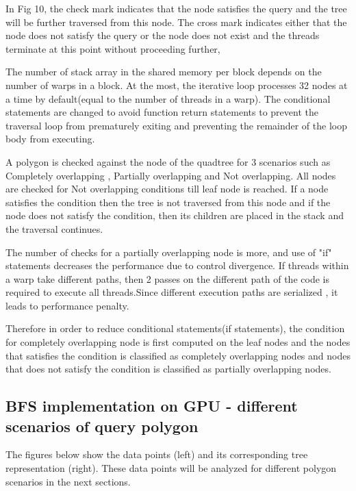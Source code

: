\documentclass{article}
\begin{document}
In Fig 10,  the check mark indicates that the node  satisfies the query and the tree will be further traversed from this node. The cross mark indicates either that the node does not satisfy the query or the node does not exist and the threads terminate at this point without proceeding further,

The number of stack array in the shared memory per block depends on the number of warps in a block. At the most, the iterative loop processes 32 nodes at a time by default(equal to the number of threads in a warp). 
The conditional statements are changed to avoid function return statements to prevent the traversal loop from prematurely exiting and preventing the remainder of the loop body from executing.

A polygon is checked against the node of the quadtree for 3 scenarios such as Completely overlapping , Partially overlapping  and Not overlapping.
All nodes are checked for Not overlapping conditions till leaf node is reached. If a node satisfies the condition then the tree is not traversed from this node and if the node does not satisfy the condition, then its children are placed in the stack and the traversal continues.

The number of checks for a partially overlapping node is more, and use of "if" statements decreases the performance due to control divergence. If threads within a warp take different paths, then 2 passes on the different path of the code is required to execute all threads.Since different execution paths are serialized , it leads to performance penalty.

Therefore in order to reduce conditional statements(if statements), the condition for completely overlapping node is first computed on the leaf nodes and the nodes that satisfies the condition is classified as completely overlapping nodes and nodes that does not satisfy the condition is classified as partially overlapping nodes.









 \subsection{BFS implementation on GPU - different scenarios of query polygon}

\vspace{1cm}
 The figures below show the data points (left) and its corresponding tree representation (right). These data points will be analyzed for different polygon scenarios in the next sections.
 
\end{document}
